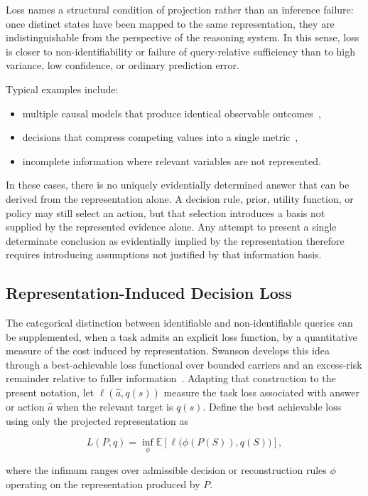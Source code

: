 \documentclass[11pt]{article}
\begin{document}
Loss names a structural condition of projection rather than an inference failure: once distinct states have been mapped to the same representation, they are indistinguishable from the perspective of the reasoning system. In this sense, loss is closer to non-identifiability or failure of query-relative sufficiency than to high variance, low confidence, or ordinary prediction error.

Typical examples include:
\begin{itemize}[leftmargin=1.5em]
    \item multiple causal models that produce identical observable outcomes~\cite{Pearl2009},
    \item decisions that compress competing values into a single metric~\cite{Savage1954},
    \item incomplete information where relevant variables are not represented.
\end{itemize}

In these cases, there is no uniquely evidentially determined answer that can be derived from the representation alone. A decision rule, prior, utility function, or policy may still select an action, but that selection introduces a basis not supplied by the represented evidence alone. Any attempt to present a single determinate conclusion as evidentially implied by the representation therefore requires introducing assumptions not justified by that information basis.

\subsection{Representation-Induced Decision Loss}

The categorical distinction between identifiable and non-identifiable queries can be supplemented, when a task admits an explicit loss function, by a quantitative measure of the cost induced by representation. Swanson develops this idea through a best-achievable loss functional over bounded carriers and an excess-risk remainder relative to fuller information~\cite{Swanson2026Carriers}. Adapting that construction to the present notation, let \(\ell(\hat a,q(s))\) measure the task loss associated with answer or action \(\hat a\) when the relevant target is \(q(s)\). Define the best achievable loss using only the projected representation as

\[
L(P,q)
=
\inf_{\phi}
\mathbb{E}
\left[
\ell\bigl(\phi(P(S)),q(S)\bigr)
\right],
\]

where the infimum ranges over admissible decision or reconstruction rules \(\phi\) operating on the representation produced by \(P\).
\end{document}
